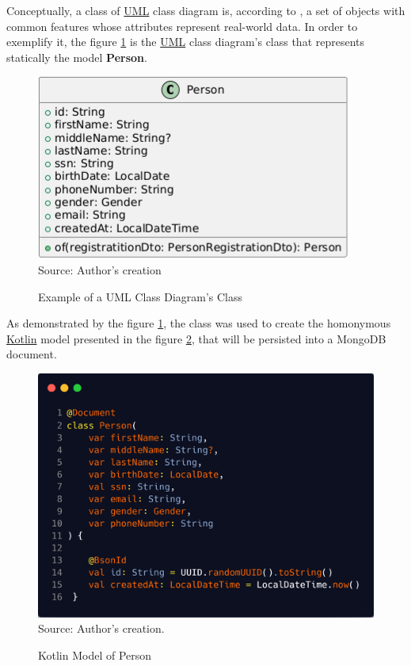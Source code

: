 Conceptually, a class of \hyperref[appendix:glossary]{UML} class diagram is, according to \cite{BERARDI200570, vo2020transformation}, a set of objects with 
common features whose attributes represent real-world data. In order to exemplify it, the figure \ref{fig:person_class} is the \hyperref[appendix:glossary]{UML} class diagram's class that represents statically the model \textbf{Person}. 

\begin{figure}[H]
    \caption{Example of a UML Class Diagram's Class}
    \centering
    \includegraphics[width=0.87\linewidth]{figures/person_class.png}
    \label{fig:person_class}
    \\ \footnotesize Source: Author's creation
\end{figure}

As demonstrated by the figure \ref{fig:person_class}, the class was used to create the homonymous \hyperref[appendix:glossary]{Kotlin} model presented in the figure \ref{fig:kotlin_person_model}, that will be persisted into a MongoDB document. 

\begin{figure}[H]
    \centering
    \caption{Kotlin Model of Person}
    \includegraphics[width=0.87\linewidth]{figures/kotlin_person_model.png}
    \label{fig:kotlin_person_model}
    \\ \footnotesize Source: Author's creation.
\end{figure}

